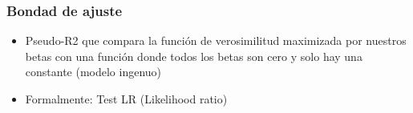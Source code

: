 \begin{frame}[fragile]
	\frametitle{Bondad de ajuste}
	\begin{itemize}
		\item Pseudo-R2 que compara la función de verosimilitud maximizada por nuestros betas con una función
		donde todos los betas son cero y solo hay una constante (modelo ingenuo)
		
		\item Formalmente: Test LR  (Likelihood ratio)
		
	\end{itemize}
\end{frame}